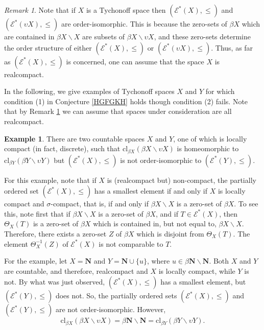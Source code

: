 \documentclass{amsart}
\theoremstyle{definition}
\newtheorem{example}[theorem]{Example}
\theoremstyle{remark}
\newtheorem{remark}[theorem]{Remark}
\theoremstyle{notation}
\numberwithin{equation}{section}
\begin{document}
\begin{remark}\label{UHD}
Note that if $X$ is a Tychonoff space  then $({\mathscr E}^*(X),\leq)$ and $({\mathscr E}^*(\upsilon X),\leq)$ are order-isomorphic. This is because the zero-sets of $\beta X$ which are contained in $\beta X\backslash X$ are subsets of $\beta X\backslash\upsilon X$, and these zero-sets determine the order structure of either $({\mathscr E}^*(X),\leq)$ or $({\mathscr E}^*(\upsilon X),\leq)$. Thus, as far as $({\mathscr E}^*(X),\leq)$ is concerned, one can assume that the space $X$ is realcompact.
\end{remark}

In the following, we give examples of Tychonoff spaces $X$ and $Y$ for which condition (1) in Conjecture \ref{HGFGKH} holds though condition (2) fails. Note that by Remark \ref{UHD} we can assume that spaces under consideration are all realcompact.

\begin{example}\label{YGFSW}
There are two countable spaces $X$ and $Y$, one of which is locally compact (in fact, discrete), such that $\mbox{cl}_{\beta X}(\beta X\backslash\upsilon X)$ is homeomorphic to $\mbox{cl}_{\beta Y}(\beta Y\backslash\upsilon Y)$ but $({\mathscr E}^*(X),\leq)$ is not order-isomorphic to $({\mathscr E}^*(Y),\leq)$.

For this example, note that if $X$ is (realcompact but) non-compact, the partially ordered set $({\mathscr E}^*(X),\leq)$ has a smallest element if and only if $X$ is locally compact and $\sigma$-compact, that is, if and only if $\beta X\backslash X$ is a zero-set of $\beta X$. To see this, note first that if $\beta X\backslash X$ is a zero-set of $\beta X$, and if $T\in{\mathscr E}^*(X)$, then $\Theta_X(T)$ is a zero-set of $\beta X$ which is contained in, but not equal to, $\beta X\backslash X$. Therefore, there exists a zero-set $Z$ of $\beta X$ which is disjoint from $\Theta_X(T)$. The element $\Theta_X^{-1}(Z)$ of ${\mathscr E}^*(X)$ is not comparable to $T$.

For the example, let $X=\mathbf{N}$ and $Y=\mathbf{N}\cup\{u\}$, where $u\in\beta\mathbf{N}\backslash\mathbf{N}$. Both $X$ and $Y$ are countable, and therefore, realcompact and $X$ is locally compact, while $Y$ is not. By what was just observed, $({\mathscr E}^*(X),\leq)$ has a smallest element, but $({\mathscr E}^*(Y),\leq)$ does not. So, the  partially ordered sets $({\mathscr E}^*(X),\leq)$ and $({\mathscr E}^*(Y),\leq)$ are not order-isomorphic. However,
\[\mbox{cl}_{\beta X}(\beta X\backslash\upsilon X)=\beta\mathbf{N}\backslash\mathbf{N}=\mbox{cl}_{\beta Y}(\beta Y\backslash\upsilon Y).\]
\end{example}
\end{document}
